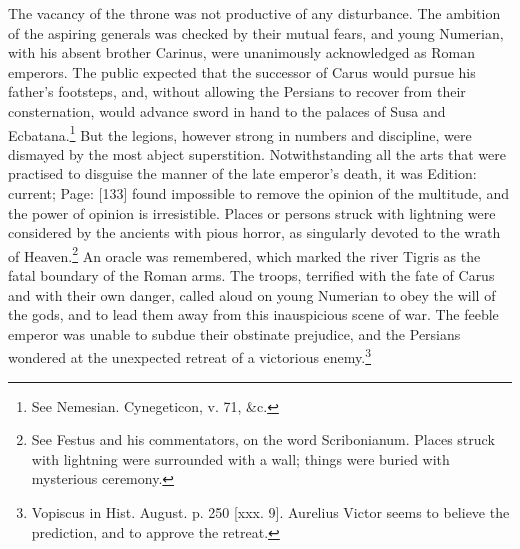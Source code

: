 The vacancy of the throne was not productive of any disturbance. The ambition of the aspiring generals was checked by their mutual fears, and young Numerian, with his absent brother Carinus, were unanimously acknowledged as Roman emperors. The public expected that the successor of Carus would pursue his father\texthebrew{}’s footsteps, and, without allowing the Persians to recover from their consternation, would advance sword in hand to the palaces of Susa and Ecbatana.\footnote{See Nemesian. Cynegeticon, v. 71, \&c.} But the legions, however strong in numbers and discipline, were dismayed by the most abject superstition. Notwithstanding all the arts that were practised to disguise the manner of the late emperor\texthebrew{}’s death, it was Edition: current; Page: [133] found impossible to remove the opinion of the multitude, and the power of opinion is irresistible. Places or persons struck with lightning were considered by the ancients with pious horror, as singularly devoted to the wrath of Heaven.\footnote{See Festus and his commentators, on the word Scribonianum. Places struck with lightning were surrounded with a wall; things were buried with mysterious ceremony.} An oracle was remembered, which marked the river Tigris as the fatal boundary of the Roman arms. The troops, terrified with the fate of Carus and with their own danger, called aloud on young Numerian to obey the will of the gods, and to lead them away from this inauspicious scene of war. The feeble emperor was unable to subdue their obstinate prejudice, and the Persians wondered at the unexpected retreat of a victorious enemy.\footnote{Vopiscus in Hist. August. p. 250 [xxx. 9]. Aurelius Victor seems to believe the prediction, and to approve the retreat.}

